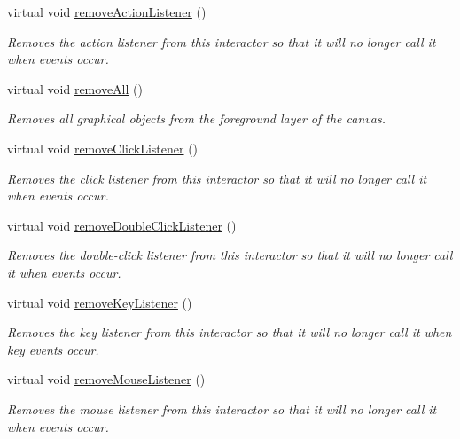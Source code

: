 \begin{DoxyCompactItemize}
virtual void \mbox{\hyperlink{classsgl_1_1GInteractor_ab7fe7a876367b87cf7202f947f1d05e4}{remove\+Action\+Listener}} ()
\begin{DoxyCompactList}\small\item\em Removes the action listener from this interactor so that it will no longer call it when events occur. \end{DoxyCompactList}\item 
virtual void \mbox{\hyperlink{classsgl_1_1GCanvas_a9b0a5a3ad9972ab0e8eb0b54873aac6b}{remove\+All}} ()
\begin{DoxyCompactList}\small\item\em Removes all graphical objects from the foreground layer of the canvas. \end{DoxyCompactList}\item 
virtual void \mbox{\hyperlink{classsgl_1_1GInteractor_ad39d0325cde6b97ebda4b9d7787c633b}{remove\+Click\+Listener}} ()
\begin{DoxyCompactList}\small\item\em Removes the click listener from this interactor so that it will no longer call it when events occur. \end{DoxyCompactList}\item 
virtual void \mbox{\hyperlink{classsgl_1_1GInteractor_aa4250907e4cdd77349c04f0cf5cdd3d3}{remove\+Double\+Click\+Listener}} ()
\begin{DoxyCompactList}\small\item\em Removes the double-\/click listener from this interactor so that it will no longer call it when events occur. \end{DoxyCompactList}\item 
virtual void \mbox{\hyperlink{classsgl_1_1GInteractor_a43095f41cab3be732b49f29970484b05}{remove\+Key\+Listener}} ()
\begin{DoxyCompactList}\small\item\em Removes the key listener from this interactor so that it will no longer call it when key events occur. \end{DoxyCompactList}\item 
virtual void \mbox{\hyperlink{classsgl_1_1GInteractor_aff47f71ce47e688a07c9d38dc92fcc11}{remove\+Mouse\+Listener}} ()
\begin{DoxyCompactList}\small\item\em Removes the mouse listener from this interactor so that it will no longer call it when events occur. \end{DoxyCompactList}\item 

\end{DoxyCompactItemize}
